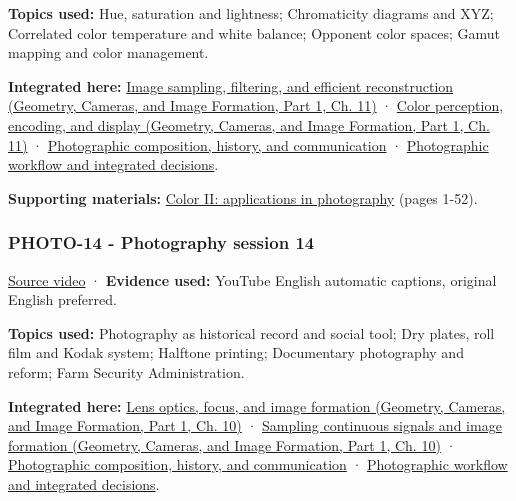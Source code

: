 \textbf{Topics used:} Hue, saturation and lightness; Chromaticity diagrams and XYZ; Correlated color temperature and white balance; Opponent color spaces; Gamut mapping and color management.

\textbf{Integrated here:} \href{../03-Geometry-Cameras-and-Image-Formation-P01/main.pdf\#03-visual-computing-i-ch004-image-sampling-filtering-and-efficient-reconstruction}{Image sampling, filtering, and efficient reconstruction (Geometry, Cameras, and Image Formation, Part 1, Ch. 11)} · \href{../03-Geometry-Cameras-and-Image-Formation-P01/main.pdf\#03-visual-computing-i-ch004-color-perception-encoding-and-display}{Color perception, encoding, and display (Geometry, Cameras, and Image Formation, Part 1, Ch. 11)} · \hyperref[04-visual-computing-ii-ch034-photographic-composition-history-and-communication]{Photographic composition, history, and communication} · \hyperref[04-visual-computing-ii-ch034-photographic-workflow-and-integrated-decisions]{Photographic workflow and integrated decisions}.

\textbf{Supporting materials:} \href{https://drive.google.com/open?id=0B6w2XfPHEcZYWllrZHZzRHlZWlk}{Color II: applications in photography} (pages 1-52).

\subsubsection{PHOTO-14 - Photography session 14}\label{04-visual-computing-ii-ch036-photo-14---photography-session-14}

\hypertarget{04-visual-computing-ii-ch036-photo-14---photography-session-14}{}

\href{https://www.youtube.com/watch?v=p964fzQC11g}{Source video} · \textbf{Evidence used:} YouTube English automatic captions, original English preferred.

\textbf{Topics used:} Photography as historical record and social tool; Dry plates, roll film and Kodak system; Halftone printing; Documentary photography and reform; Farm Security Administration.

\textbf{Integrated here:} \href{../03-Geometry-Cameras-and-Image-Formation-P01/main.pdf\#03-visual-computing-i-ch003-lens-optics-focus-and-image-formation}{Lens optics, focus, and image formation (Geometry, Cameras, and Image Formation, Part 1, Ch. 10)} · \href{../03-Geometry-Cameras-and-Image-Formation-P01/main.pdf\#03-visual-computing-i-ch003-sampling-continuous-signals-and-image-formation}{Sampling continuous signals and image formation (Geometry, Cameras, and Image Formation, Part 1, Ch. 10)} · \hyperref[04-visual-computing-ii-ch034-photographic-composition-history-and-communication]{Photographic composition, history, and communication} · \hyperref[04-visual-computing-ii-ch034-photographic-workflow-and-integrated-decisions]{Photographic workflow and integrated decisions}.

